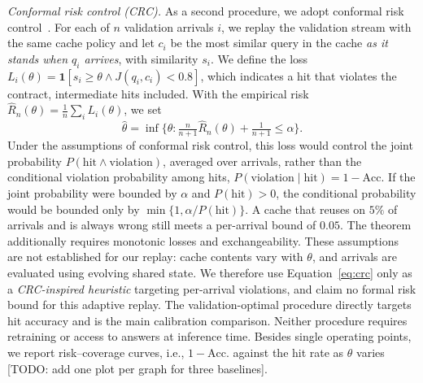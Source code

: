 \documentclass[runningheads]{llncs}
\newcommand{\hp}[1]{{\color{red!75!black}#1}}
\begin{document}
\emph{Conformal risk control (CRC).} As a second procedure, we adopt
conformal risk control~\cite{angelopoulos2024crc,vovk2005alrw}. For each of
$n$ validation arrivals $i$, we replay the validation stream with the same
cache policy and let $c_i$ be the most similar query in the cache \emph{as it
stands when $q_i$ arrives}, with similarity $s_i$. We define the loss
$L_i(\theta) = \mathbf{1}[s_i \geq \theta \wedge J(q_i,c_i) < 0.8]$, which
indicates a hit that violates the contract, intermediate hits included. With
the empirical risk $\hat{R}_n(\theta) = \frac{1}{n}\sum_i L_i(\theta)$, we set
\begin{equation}
\hat{\theta} = \inf\Big\{\theta : \tfrac{n}{n+1}\hat{R}_n(\theta) + \tfrac{1}{n+1} \leq \alpha\Big\}.
\label{eq:crc}
\end{equation}
Under the assumptions of conformal risk control, this loss would control
the joint probability $P(\text{hit} \wedge \text{violation})$, averaged over
arrivals, rather than the conditional violation probability among hits,
$P(\text{violation} \mid \text{hit}) = 1 - \mathrm{Acc.}$ If the joint
probability were bounded by $\alpha$ and $P(\text{hit}) > 0$, the conditional
probability would be bounded only by
$\min\{1, \alpha/P(\text{hit})\}$. A cache that reuses on $5\%$ of arrivals
and is always wrong still meets a per-arrival bound of $0.05$.
The theorem additionally requires monotonic losses and exchangeability.
These assumptions are not established for our replay: cache contents vary
with $\theta$, and arrivals are evaluated using evolving shared state. We
therefore use Equation~\ref{eq:crc} only as a \emph{CRC-inspired heuristic}
targeting per-arrival violations, and claim no formal risk bound for this
adaptive replay. The validation-optimal procedure directly targets hit
accuracy and is the main calibration comparison.
Neither procedure requires retraining or access to
answers at inference time. Besides single operating points, we report
risk--coverage curves, i.e., $1 - \mathrm{Acc.}$ against the hit rate as
$\theta$ varies \hp{[TODO: add one plot per graph for three baselines]}.
\end{document}
